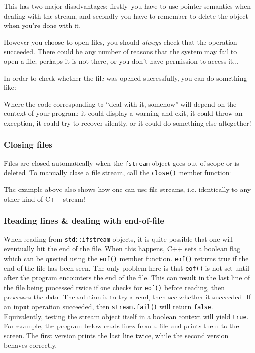 \documentclass[a4paper]{scrartcl}
\begin{document}
This has two major disadvantages; firstly, you have to use pointer semantics when dealing with the stream, and secondly you have to remember to delete the object when you're done with it.

However you choose to open files, you should \emph{always} check that the operation succeeded. There could be any number of reasons that the system may fail to open a file; perhaps it is not there, or you don't have permission to access it...

In order to check whether the file was opened successfully, you can do something like:


Where the code corresponding to ``deal with it, somehow'' will depend on the context of your program; it could display a warning and exit, it could throw an exception, it could try to recover silently, or it could do something else altogether!

\subsubsection{Closing files}
Files are closed automatically when the \verb|fstream| object goes out of scope or is deleted. To manually close a file stream, call the \verb|close()| member function:


The example above also shows how one can use file streams, i.e. identically to any other kind of C++ stream!

\subsubsection{Reading lines \& dealing with end-of-file}
When reading from \verb|std::ifstream| objects, it is quite possible that one will eventually hit the end of the file. When this happens, C++ sets a boolean flag which can be queried using the \verb|eof()| member function. \verb|eof()| returns true if the end of the file has been seen. The only problem here is that \verb|eof()| is not set until after the program encounters the end of the file. This can result in the last line of the file being processed twice if one checks for \verb|eof()| before reading, then processes the data. The solution is to try a read, then see whether it succeeded. If an input operation succeeded, then \verb|stream.fail()| will return \verb|false|. Equivalently, testing the stream object itself in a boolean context will yield \verb|true|. For example, the program below reads lines from a file and prints them to the screen. The first version prints the last line twice, while the second version behaves correctly.
\end{document}
